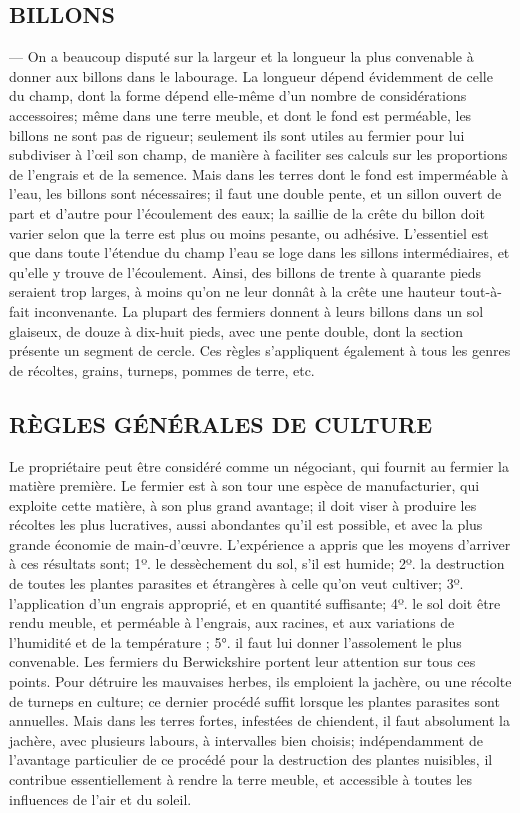 \subsection{BILLONS} — On a beaucoup disputé sur la largeur et la longueur la plus convenable à donner aux billons dans le labourage. La longueur dépend évidemment de celle du champ, dont la forme dépend elle-même d’un nombre de considérations accessoires; même dans une terre meuble, et dont le fond est perméable, les billons ne sont pas de rigueur; seulement ils sont utiles au fermier pour lui subdiviser à l’œil son champ, de manière à faciliter ses calculs sur les proportions de l’engrais et de la semence. Mais dans les terres dont le fond est imperméable à l’eau, les billons sont nécessaires; il faut une double pente, et un sillon ouvert de part et d’autre pour l’écoulement des eaux; la saillie de la crête du billon doit varier selon que la terre est plus ou moins pesante, ou adhésive. L’essentiel est que dans toute\setcounter{page}{80} l'étendue du champ l'eau se loge dans les sillons intermédiaires, et qu'elle y trouve de l'écoulement. Ainsi, des billons de trente à quarante pieds seraient trop larges, à moins qu'on ne leur donnât à la crête une hauteur tout-à-fait inconvenante. La plupart des fermiers donnent à leurs billons dans un sol glaiseux, de douze à dix-huit pieds, avec une pente double, dont la section présente un segment de cercle. Ces règles s'appliquent également à tous les genres de récoltes, grains, turneps, pommes de terre, etc.
\subsection{RÈGLES GÉNÉRALES DE CULTURE} Le propriétaire peut être considéré comme un négociant, qui fournit au fermier la matière première. Le fermier est à son tour une espèce de manufacturier, qui exploite cette matière, à son plus grand avantage; il doit viser à produire les récoltes les plus lucratives, aussi abondantes qu'il est possible, et avec la plus grande économie de main-d'œuvre. L'expérience a appris que les moyens d'arriver à ces résultats sont; 1º. le dessèchement du sol, s'il est humide; 2º. la destruction de toutes les plantes parasites et étrangères à celle qu'on veut cultiver; 3º. l'application d'un engrais approprié, et en quantité suffisante; 4º. le sol doit être rendu meuble, et perméable à l'engrais, aux racines,\setcounter{page}{81} et aux variations de l'humidité et de la température ; 5°. il faut lui donner l'assolement le plus convenable. Les fermiers du Berwickshire portent leur attention sur tous ces points.
Pour détruire les mauvaises herbes, ils emploient la jachère, ou une récolte de turneps en culture; ce dernier procédé suffit lorsque les plantes parasites sont annuelles. Mais dans les terres fortes, infestées de chiendent, il faut absolument la jachère, avec plusieurs labours, à intervalles bien choisis; indépendamment de l'avantage particulier de ce procédé pour la destruction des plantes nuisibles, il contribue essentiellement à rendre la terre meuble, et accessible à toutes les influences de l'air et du soleil.
